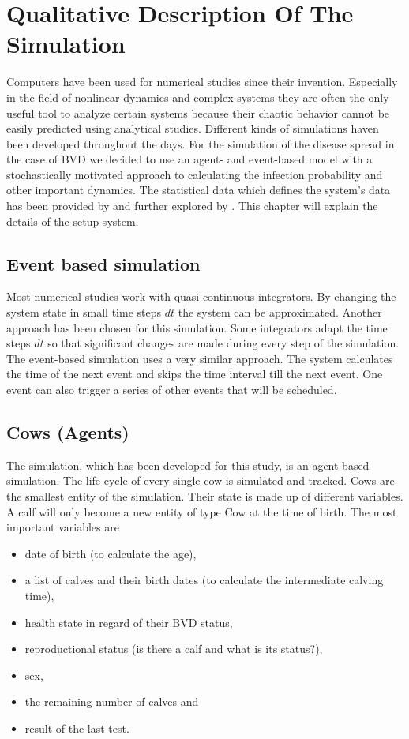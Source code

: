 \chapter{Qualitative Description Of The Simulation}
Computers have been used for numerical studies since their invention. Especially in the field of nonlinear dynamics and complex systems they are often the only useful tool to analyze certain systems because their chaotic behavior cannot be easily predicted using analytical studies. Different kinds of simulations haven been developed throughout the days. For the simulation of the disease spread in the case of BVD we decided to use an agent- and event-based model with a stochastically motivated approach to calculating the infection probability and other important dynamics. The statistical data which defines the system's data has been provided by \citep{personalCom} and further explored by \citep{steinbach16}. This chapter will explain the details of the setup system.
\section{Event based simulation}
Most numerical studies work with quasi continuous integrators. By changing the system state in small time steps $dt$ the system can be approximated. Another approach has been chosen for this simulation. Some integrators adapt the time steps $dt$ so that significant changes are made during every step of the simulation. The event-based simulation uses a very similar approach. The system calculates the time of the next event and skips the time interval till the next event. One event can also trigger a series of other events that will be scheduled. 
\section{Cows (Agents)}
The simulation, which has been developed for this study, is an agent-based simulation. The life cycle of every single cow is simulated and tracked. Cows are the smallest entity of the simulation. Their state is made up of different variables. A calf will only become a new entity of type Cow at the time of birth. The most important variables are 
\begin{itemize}
\item date of birth (to calculate the age),
\item a list of calves and their birth dates (to calculate the intermediate calving time),
\item health state in regard of their BVD status,
\item reproductional status (is there a calf and what is its status?),
\item sex,
\item the remaining number of calves and
\item result of the last test.
\end{itemize}

